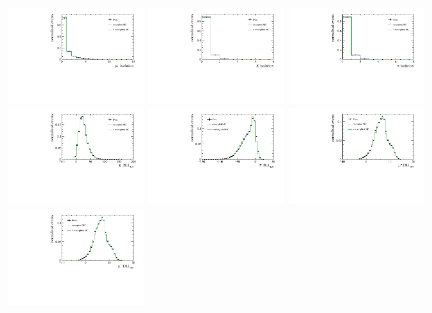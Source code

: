 \begin{figure}[!htb]
 \includegraphics[width=0.32\textwidth]{figs/kpimm/data-mc/bdt/Muminus_isolation_V2_15.pdf}
 \includegraphics[width=0.32\textwidth]{figs/kpimm/data-mc/bdt/kaon_isolation.pdf}
 \includegraphics[width=0.32\textwidth]{figs/kpimm/data-mc/bdt/pion_isolation.pdf}
 \includegraphics[width=0.32\textwidth]{figs/kpimm/data-mc/bdt/K_PIDK.pdf}
 \includegraphics[width=0.32\textwidth]{figs/kpimm/data-mc/bdt/Pi_PIDK.pdf}
 \includegraphics[width=0.32\textwidth]{figs/kpimm/data-mc/bdt/Muplus_PIDmu.pdf}
 \includegraphics[width=0.32\textwidth]{figs/kpimm/data-mc/bdt/Muminus_PIDmu.pdf}
 

\end{figure}
